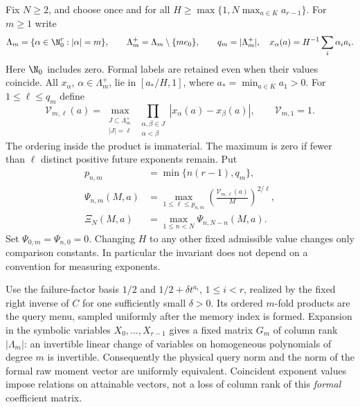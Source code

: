 \documentclass[11pt]{amsart}
\theoremstyle{definition}\newtheorem{definition}[theorem]{Definition}
\theoremstyle{remark}\newtheorem{remark}[theorem]{Remark}
\begin{document}
Fix $N\ge2$, and choose once and for all
$H\ge\max\{1,N\max_{a\in K}a_{r-1}\}$. For $m\ge1$ write
\[
 \Lambda_m=\{\alpha\in\N_0^r:|\alpha|=m\},\qquad
 \Lambda_m^+=\Lambda_m\setminus\{me_0\},\qquad
 q_m=|\Lambda_m^+|,
 \quad x_\alpha(a)=H^{-1}\sum_i\alpha_i a_i.
\]
Here $\N_0$ includes zero. Formal labels are retained even when their
values coincide. All $x_\alpha$, $\alpha\in\Lambda_m^+$, lie in
$[a_*/H,1]$, where $a_* =\min_{a\in K}a_1>0$.
For $1\le\ell\le q_m$ define
\begin{equation}\label{eq:determinant-volume}
 \mathcal V_{m,\ell}(a)=
 \max_{\substack{J\subset\Lambda_m^+\\|J|=\ell}}
    \prod_{\substack{\alpha,\beta\in J\\\alpha<\beta}}
          |x_\alpha(a)-x_\beta(a)|,
 \qquad \mathcal V_{m,1}=1.
\end{equation}
The ordering inside the product is immaterial. The maximum is zero if
fewer than $\ell$ distinct positive future exponents remain. Put
\begin{equation}\label{eq:intrinsic-profile}
 \begin{split}
 p_{n,m}&=\min\{n(r-1),q_m\},\\
 \Psi_{n,m}(M,a)&=
   \max_{1\le\ell\le p_{n,m}}
        \left(\frac{\mathcal V_{m,\ell}(a)}{M}\right)^{2/\ell},\\
 \Xi_N(M,a)&=\max_{1\le n<N}\Psi_{n,N-n}(M,a).
 \end{split}
\end{equation}
Set $\Psi_{0,m}=\Psi_{n,0}=0$. Changing $H$ to any other fixed
admissible value changes only comparison constants. In particular the
invariant does not depend on a convention for measuring exponents.

Use the failure-factor basis $1/2$ and $1/2+\delta t^{a_i}$,
$1\le i<r$, realized by the fixed right inverse of $C$ for one
sufficiently small $\delta>0$. Its ordered $m$-fold products are the
query menu, sampled uniformly after the memory index is formed. Expansion
in the symbolic variables $X_0,\ldots,X_{r-1}$ gives a fixed matrix
$G_m$ of column rank $|\Lambda_m|$: an invertible linear change of
variables on homogeneous polynomials of degree $m$ is invertible.
Consequently the physical query norm and the norm of the formal raw
moment vector are uniformly equivalent. Coincident exponent values impose
relations on attainable vectors, not a loss of column rank of this
\emph{formal} coefficient matrix.
\end{document}
